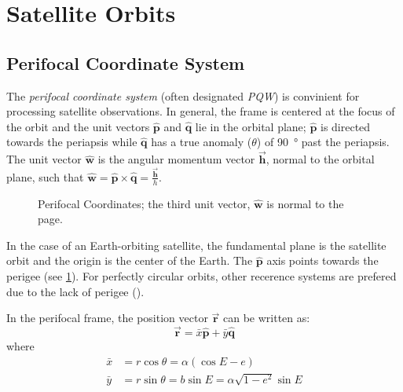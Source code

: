 \section{Satellite Orbits}
\label{sec:satellite-orbits}

\subsection{Perifocal Coordinate System}
The \emph{perifocal coordinate system} (often designated \emph{PQW}) is 
convinient for processing satellite observations. In general, the frame is 
centered at the focus of the orbit and the unit vectors $\hat{\bm{p}}$ and 
$\hat{\bm{q}}$ lie in the orbital plane; $\hat{\bm{p}}$ is directed towards 
the periapsis while $\hat{\bm{q}}$ has a true anomaly ($\theta$) of 
\SI{90}{\degree} past the periapsis. The unit vector $\hat{\bm{w}}$ is the 
angular momentum vector $\vec{\bm{h}}$, normal to the orbital plane, such that 
$\hat{\bm{w}} = \hat{\bm{p}} \times \hat{\bm{q}} = \frac{\vec{\bm{h}}}{h}$.

\begin{figure}
\centering
{}

\caption{Perifocal Coordinates; the third unit vector, $\hat{\bm{w}}$ is 
         normal to the page.}
\label{fig:eccentric-anomaly}
\end{figure}

In the case of an Earth-orbiting satellite, the fundamental plane is the 
satellite orbit and the origin is the center of the Earth. The $\hat{\bm{p}}$ 
axis points towards the perigee (see \ref{fig:eccentric-anomaly}). For 
perfectly circular orbits, other recerence systems are prefered due to the 
lack of perigee (\cite{Vallado}).

In the perifocal frame, the position vector $\vec{\bm{r}}$ can be written as:
\begin{equation}
  \label{eq:kurtis2107}
  \vec{\bm{r}} = \bar{x} \hat{\bm{p}} + \bar{y} \hat{\bm{q}}
\end{equation}
where
\begin{subequations}
  \begin{align}
  \label{eq:mong230a}
  \bar{x} &= r \cos \theta = \alpha ( \cos E - e ) \\
  \label{eq:mong230b}
  \bar{y} &= r \sin \theta = b \sin E = \alpha \sqrt{1-e^2} \sin E
  \end{align}
\end{subequations}


